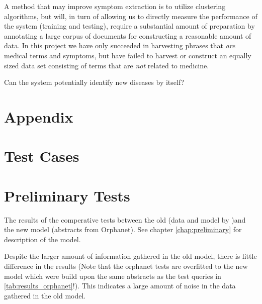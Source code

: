 \documentclass[10pt,letterpaper,final]{article}
\begin{document}
A method that may improve symptom extraction is to utilize clustering
algorithms, but will, in turn of allowing us to directly measure the
performance of the system (training and testing), require a substantial
amount of preparation by annotating a large corpus of documents for
constructing a reasonable amount of data. In this project we have only
succeeded in harvesting phrases that \textit{are} medical terms and
symptoms, but have failed to harvest or construct an equally sized data
set consisting of terms that are \textit{not} related to medicine.

Can the system potentially identify new diseases by itself?

\renewcommand\bibname{References}



\appendix
\section{Appendix}
\label{app:orphanet}

\section{Test Cases}

\section{Preliminary Tests}
\label{app:preliminary_results}

The results of the comperative tests between the old (data and model by \cite{jensenandersen})and the new model (abstracts from Orphanet). See chapter \ref{chap:preliminary} for description of the model. 

Despite the larger amount of information gathered in the old model, there is little difference in the results (Note that the orphanet tests are overfitted to the new model which were build upon the same abstracts as the test queries in \ref{tab:results_orphanet}!). This indicates a large amount of noise in the data gathered in the old model.

\newpage
\end{document}
